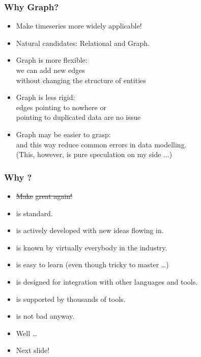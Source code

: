 \documentclass[mathserif]{beamer}
\begin{document}
\begin{frame}
\frametitle{Why Graph?}
\begin{itemize}
\item Make timeseries more widely applicable!
\item Natural candidates: Relational and Graph.
\item Graph is more flexible:\\
      we can add new edges \\
      without changing the structure of entities
\item Graph is less rigid:\\
      edges pointing to nowhere or\\
            pointing to duplicated data are no issue
\item Graph may be easier to grasp:\\
      and this way reduce common errors in data modelling.\\
      (This, however, is pure speculation on my side $\dots$)
\end{itemize}
\end{frame}

\begin{frame}
\frametitle{Why ?}
\begin{itemize}
\item \st{Make }\st{ great again!}
\item {} is standard.
\item {} is actively developed with new ideas flowing in.
\item {} is known by virtually everybody in the industry.
\item {} is easy to learn (even though tricky to master \dots)
\item {} is designed for integration with other languages and tools.
\item {} is supported by thousands of tools.
\item {} is not bad anyway.
\item Well \dots
\item Next slide!
\end{itemize}
\end{frame}
\end{document}
